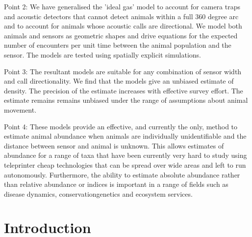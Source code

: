 \documentclass[a4paper,10pt,reqno,oneside]{amsart}
\begin{document}
Point 2: We have generalised the 'ideal gas' model to account for camera traps and acoustic detectors that cannot detect animals within a full 360 degree arc and to account for animals whose acoustic calls are directional. We model both animals and sensors as geometric shapes and drive equations for the expected number of encounters per unit time between the animal population and the sensor. The models are tested using spatially explicit simulations. 

Point 3: The resultant models are suitable for any combination of sensor width and call directionality. We find that the models give an unbiased estimate of density. The precision of the estimate increases with effective survey effort. The estimate remains remains unbiased under the range of assumptions about animal movement. 

Point 4: These models provide an effective, and currently the only, method to estimate animal abundance when animals are individually unidentifiable and the distance between sensor and animal is unknown. This allows estimates of abundance for a range of taxa that have been currently very hard to study using teleprinter cheap technologies that can be spread over wide areas and left to run autonomously. Furthermore, the ability to estimate absolute abundance rather than relative abundance or indices is important in a range of fields such as disease dynamics, conservationgenetics and ecosystem services. 


\section{Introduction}
\end{document}
